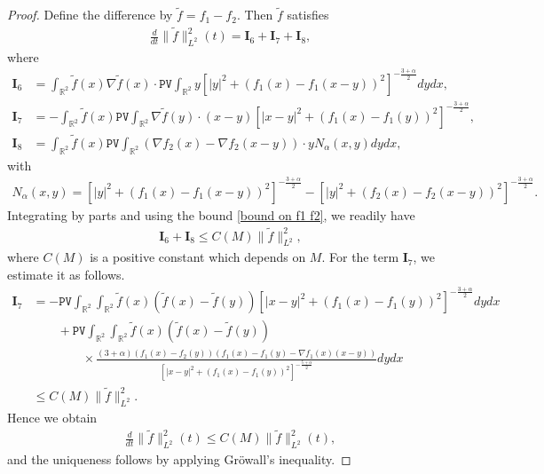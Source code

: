 \documentclass[reqno]{amsart}%
\theoremstyle{definition}
\theoremstyle{remark}
\numberwithin{equation}{section}
\newcommand{\0}{\mathbf{0}}
\newcommand{\1}{\mathbf{1}}
\newcommand{\R}{\mathbb R}
\newcommand{\PV}{\texttt{PV}}
\numberwithin{equation}{section}
\numberwithin{theorem}{section}
\numberwithin{figure}{section}
\begin{document}
\begin{proof}
Define the difference by $\tilde f=f_1-f_2$. Then $\tilde f$ satisfies
\begin{align*}
\frac{d}{dt}\|\tilde f\|^2_{L^2}(t)=\mathbf{I}_{6}+\mathbf{I}_{7}+\mathbf{I}_{8},
\end{align*}
where
\begin{align*}
\mathbf{I}_{6}&=\int_{\R^2}\tilde f(x)\nabla \tilde f(x)\cdot \PV\int_{\R^2}y\left[ |y|^2 + (f_1(x) - f_1(x - y))^2 \right]^{-\frac{3 +\alpha}{2}}dydx,\\
\mathbf{I}_{7}&=-\int_{\R^2}\tilde f(x)\PV\int_{\R^2}\nabla \tilde f(y)\cdot(x-y)\left[ |x-y|^2 + (f_1(x) - f_1(y))^2 \right]^{-\frac{3 +\alpha}{2}},\\
\mathbf{I}_{8}&=\int_{\R^2}\tilde f(x)\PV\int_{\R^2}(\nabla f_2(x) - \nabla f_2(x-y))\cdot y N_{\alpha}(x,y)dydx,
\end{align*}
with
\begin{align*}
N_{\alpha}(x,y) = \left[ |y|^2 + (f_1(x) - f_1(x - y))^2 \right]^{-\frac{3 +\alpha}{2}} - \left[ |y|^2 + (f_2(x) - f_2(x - y))^2 \right]^{-\frac{3 +\alpha}{2}}.
\end{align*}
Integrating by parts and using the bound \eqref{bound on f1 f2}, we readily have
\begin{align*}
\mathbf{I}_{6} + \mathbf{I}_{8} \le C(M)\|\tilde f\|^2_{L^2},
\end{align*}
where $C(M)$ is a positive constant which depends on $M$. For the term $\mathbf{I}_{7}$, we estimate it as follows.
\begin{align*}
\mathbf{I}_{7}&=-\PV\int_{\R^2}\int_{\R^2}\tilde f(x)(\tilde f(x) - \tilde f(y))\left[ |x-y|^2 + (f_1(x) - f_1(y))^2 \right]^{-\frac{3 +\alpha}{2}}dydx\\
&\qquad+\PV\int_{\R^2}\int_{\R^2}\tilde f(x)(\tilde f(x) - \tilde f(y))\\
&\qquad\qquad\times\frac{(3+\alpha)(f_1(x) - f_2(y))(f_1(x) - f_1(y) - \nabla f_1(x)(x-y))}{\left[ |x-y|^2 + (f_1(x) - f_1(y))^2 \right]^{-\frac{5 +\alpha}{2}}}dydx\\
&\le C(M)\|\tilde f\|^2_{L^2}.
\end{align*}
Hence we obtain
\begin{align*}
\frac{d}{dt}\|\tilde f\|^2_{L^2}(t)\le C(M)\|\tilde f\|^2_{L^2}(t),
\end{align*}
and the uniqueness follows by applying Gr\"{o}wall's inequality.
\end{proof}
\end{document}
